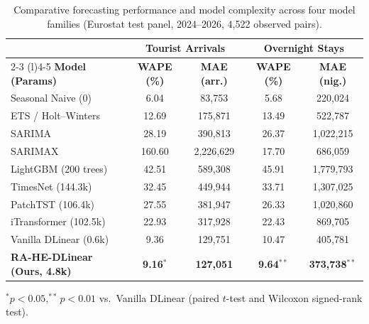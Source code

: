 \begin{table}[!t]
\centering
\caption{Comparative forecasting performance and model complexity across four model families (Eurostat test panel, 2024--2026, 4,522 observed pairs).}
\label{tab:reviewer_benchmark}
\scriptsize
\setlength{\tabcolsep}{2.5pt}
\renewcommand{\arraystretch}{1.04}
\begin{tabular}{@{}l cccc@{}}
\toprule
& \multicolumn{2}{c}{\textbf{Tourist Arrivals}} & \multicolumn{2}{c}{\textbf{Overnight Stays}} \\
\cmidrule(lr){2-3} \cmidrule(l){4-5}
\textbf{Model (Params)} & \textbf{WAPE (\%)} & \textbf{MAE (arr.)} & \textbf{WAPE (\%)} & \textbf{MAE (nig.)} \\
\midrule
Seasonal Naive (0) & 6.04 & 83,753 & 5.68 & 220,024 \\
ETS / Holt--Winters & 12.69 & 175,871 & 13.49 & 522,787 \\
SARIMA & 28.19 & 390,813 & 26.37 & 1,022,215 \\
SARIMAX & 160.60 & 2,226,629 & 17.70 & 686,059 \\
LightGBM (200 trees) & 42.51 & 589,308 & 45.91 & 1,779,793 \\
\midrule
TimesNet (144.3k) & 32.45 & 449,944 & 33.71 & 1,307,025 \\
PatchTST (106.4k) & 27.55 & 381,947 & 26.33 & 1,020,860 \\
iTransformer (102.5k) & 22.93 & 317,928 & 22.43 & 869,705 \\
Vanilla DLinear (0.6k) & 9.36 & 129,751 & 10.47 & 405,781 \\
\midrule
\textbf{RA-HE-DLinear (Ours, 4.8k)} & \textbf{9.16}$^{*}$ & \textbf{127,051} & \textbf{9.64}$^{**}$ & \textbf{373,738}$^{**}$ \\
\bottomrule
\end{tabular}
\par\vspace{1.5pt}
\scriptsize\raggedright 
$^{*}p < 0.05, ^{**}p < 0.01$ vs.\ Vanilla DLinear (paired $t$-test and Wilcoxon signed-rank test).
\end{table}
